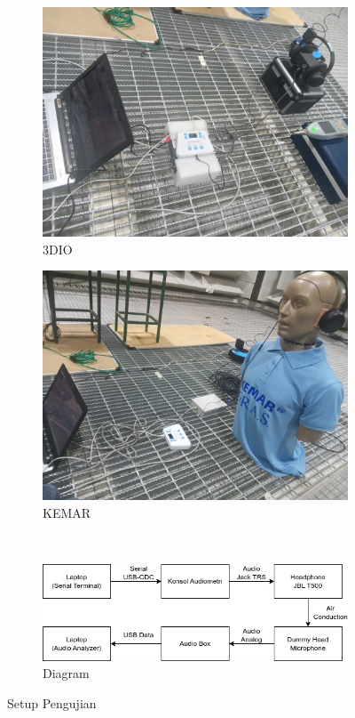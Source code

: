 \documentclass{article}
\begin{document}
	\begin{figure}[H]
		\centering
		\begin{subfigure}[]{.45\textwidth}
			\includegraphics[width=\textwidth]{images/3dio_setup}
			\caption{3DIO}
		\end{subfigure}
		\begin{subfigure}[]{.45\textwidth}
			\includegraphics[width=\textwidth]{images/kemar_setup}
			\caption{KEMAR}
		\end{subfigure}
		\\
		\begin{subfigure}[]{.6\textwidth}
			\includegraphics[width=\textwidth]{images/diagram/setup_uji}
			\caption{Diagram}
		\end{subfigure}
		\caption{Setup Pengujian}
	\end{figure}
	
\end{document}
